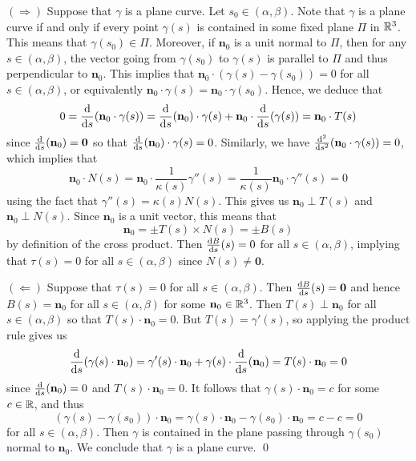 \begin{pf}
    $(\Rightarrow)$ Suppose that $\gamma$ is a plane curve. 
    Let $s_0 \in (\alpha, \beta)$. Note that $\gamma$ 
    is a plane curve if and only if every point $\gamma(s)$ is contained 
    in some fixed plane $\Pi$ in $\mathbb{R}^3$. This means that $\gamma(s_0) \in \Pi$. 
    Moreover, if $\mathbf n_0$ is a unit normal to $\Pi$, then for any 
    $s \in (\alpha, \beta)$, the vector going from $\gamma(s_0)$ to $\gamma(s)$
    is parallel to $\Pi$ and thus perpendicular to $\mathbf n_0$. 
    This implies that $\mathbf n_0 \cdot (\gamma(s) - \gamma(s_0)) = 0$ 
    for all $s \in (\alpha, \beta)$, or equivalently 
    $\mathbf n_0 \cdot \gamma(s) = \mathbf n_0 \cdot \gamma(s_0)$. 
    Hence, we deduce that 
    \[ 0 = \frac{{\rm d}}{{\rm d}s}(\mathbf{n}_0 \cdot \gamma(s)) 
    = \frac{{\rm d}}{{\rm d}s}(\mathbf n_0) \cdot \gamma(s) 
    + \mathbf n_0 \cdot \frac{{\rm d}}{{\rm d}s}(\gamma(s)) 
    = \mathbf n_0 \cdot T(s) \] 
    since $\frac{\rm d}{{\rm d}s}(\mathbf n_0) = \mathbf 0$ so that 
    $\frac{\rm d}{{\rm d}s}(\mathbf n_0) \cdot \gamma(s) = 0$. 
    Similarly, we have $\frac{\rm d^2}{{\rm d}s^2}(\mathbf n_0 \cdot 
    \gamma(s)) = 0$, which implies that 
    \[ \mathbf n_0 \cdot N(s) = \mathbf n_0 \cdot \frac{1}{\kappa(s)} \gamma''(s)
    = \frac{1}{\kappa(s)} \mathbf n_0 \cdot \gamma''(s) = 0 \] 
    using the fact that $\gamma''(s) = \kappa(s)N(s)$. This gives us 
    $\mathbf n_0 \perp T(s)$ and $\mathbf n_0 \perp N(s)$. Since 
    $\mathbf n_0$ is a unit vector, this means that 
    \[ \mathbf n_0 = \pm T(s) \times N(s) = \pm B(s) \] 
    by definition of the cross product. Then $\frac{{\rm d}B}{{\rm d}s}(s) = 0$ 
    for all $s \in (\alpha, \beta)$, implying that $\tau(s) = 0$ for all 
    $s \in (\alpha, \beta)$ since $N(s) \neq \mathbf 0$. 

    $(\Leftarrow)$ Suppose that $\tau(s) = 0$ for all $s \in (\alpha, \beta)$.
    Then $\frac{{\rm d}B}{{\rm d}s}(s) = \mathbf 0$ and hence 
    $B(s) = \mathbf n_0$ for all $s \in (\alpha, \beta)$ for some $\mathbf n_0 \in \mathbb{R}^3$. 
    Then $T(s) \perp \mathbf n_0$ for all $s \in (\alpha, \beta)$ so that 
    $T(s) \cdot \mathbf n_0 = 0$. But $T(s) = \gamma'(s)$, so applying the product 
    rule gives us
    \[ \frac{\rm d}{{\rm d}s}(\gamma(s) \cdot \mathbf n_0)
    = \gamma'(s) \cdot \mathbf n_0 + \gamma(s) \cdot \frac{\rm d}{{\rm d}s}(\mathbf n_0) 
    = T(s) \cdot \mathbf n_0 = 0 \] 
    since $\frac{\rm d}{{\rm d}s}(\mathbf n_0) = 0$ and $T(s) \cdot \mathbf n_0 = 0$.
    It follows that $\gamma(s) \cdot \mathbf n_0 = c$ for some $c \in \mathbb{R}$, and thus 
    \[ (\gamma(s) - \gamma(s_0)) \cdot \mathbf n_0 = \gamma(s) \cdot 
    \mathbf n_0 - \gamma(s_0) \cdot \mathbf n_0 = c - c = 0 \] 
    for all $s \in (\alpha, \beta)$. Then $\gamma$ is contained in the plane 
    passing through $\gamma(s_0)$ normal to $\mathbf n_0$. We conclude that 
    $\gamma$ is a plane curve. \qed 
\end{pf}\vspace{-0.25cm}

